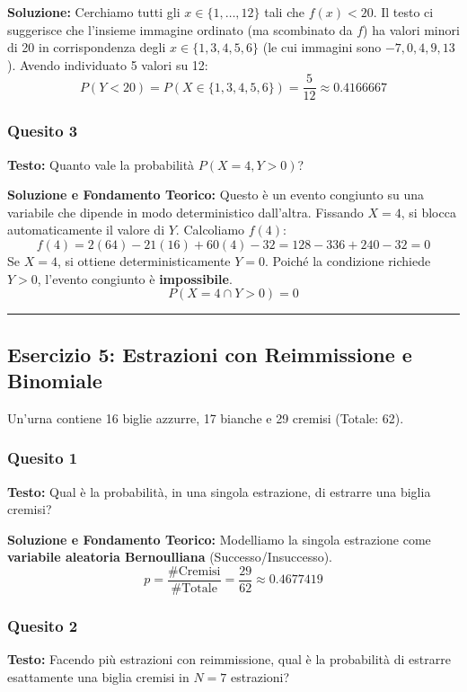 \documentclass[12pt, a4paper]{article}
\begin{document}
\textbf{Soluzione:}
Cerchiamo tutti gli $x \in \{1,\dots,12\}$ tali che $f(x) < 20$. 
Il testo ci suggerisce che l'insieme immagine ordinato (ma scombinato da $f$) ha valori minori di 20 in corrispondenza degli $x \in \{1, 3, 4, 5, 6\}$ (le cui immagini sono $-7, 0, 4, 9, 13$).
Avendo individuato 5 valori su 12:
$$ P(Y < 20) = P(X \in \{1, 3, 4, 5, 6\}) = \frac{5}{12} \approx 0.4166667 $$

\subsubsection*{Quesito 3}
\textbf{Testo:} Quanto vale la probabilità $P(X=4, Y>0)$?

\textbf{Soluzione e Fondamento Teorico:} 
Questo è un evento congiunto su una variabile che dipende in modo deterministico dall'altra. Fissando $X=4$, si blocca automaticamente il valore di $Y$. Calcoliamo $f(4)$:
$$ f(4) = 2(64) - 21(16) + 60(4) - 32 = 128 - 336 + 240 - 32 = 0 $$
Se $X=4$, si ottiene deterministicamente $Y=0$. Poiché la condizione richiede $Y>0$, l'evento congiunto è \textbf{impossibile}.
$$ P(X=4 \cap Y>0) = 0 $$

\vspace{0.5cm}\hrule\vspace{0.5cm}

\subsection*{Esercizio 5: Estrazioni con Reimmissione e Binomiale}
Un'urna contiene 16 biglie azzurre, 17 bianche e 29 cremisi (Totale: 62).

\subsubsection*{Quesito 1}
\textbf{Testo:} Qual è la probabilità, in una singola estrazione, di estrarre una biglia cremisi?

\textbf{Soluzione e Fondamento Teorico:} 
Modelliamo la singola estrazione come \textbf{variabile aleatoria Bernoulliana} (Successo/Insuccesso).
$$ p = \frac{\#\text{Cremisi}}{\#\text{Totale}} = \frac{29}{62} \approx 0.4677419 $$

\subsubsection*{Quesito 2}
\textbf{Testo:} Facendo più estrazioni con reimmissione, qual è la probabilità di estrarre esattamente una biglia cremisi in $N=7$ estrazioni?
\end{document}
